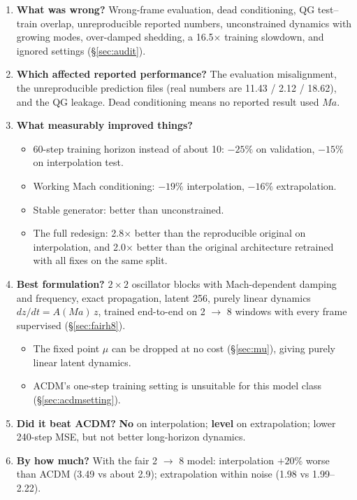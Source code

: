 \documentclass[10.5pt,a4paper]{article}
\begin{document}
\begin{enumerate}[leftmargin=*]
\item \textbf{What was wrong?} Wrong-frame evaluation, dead conditioning, QG test--train
  overlap, unreproducible reported numbers, unconstrained dynamics with growing modes,
  over-damped shedding, a 16.5$\times$ training slowdown, and ignored settings (\S\ref{sec:audit}).
\item \textbf{Which affected reported performance?} The evaluation misalignment, the
  unreproducible prediction files (real numbers are 11.43 / 2.12 / 18.62), and the QG leakage.
  Dead conditioning means no reported result used $Ma$.
\item \textbf{What measurably improved things?}
  \begin{itemize}
  \item 60-step training horizon instead of about 10: $-25\%$ on validation, $-15\%$ on
    interpolation test.
  \item Working Mach conditioning: $-19\%$ interpolation, $-16\%$ extrapolation.
  \item Stable generator: better than unconstrained.
  \item The full redesign: 2.8$\times$ better than the reproducible original on interpolation,
    and 2.0$\times$ better than the original architecture retrained with all fixes on the
    same split.
  \end{itemize}
\item \textbf{Best formulation?} $2\times2$ oscillator blocks with Mach-dependent damping and
  frequency, exact propagation, latent 256, purely linear dynamics $dz/dt = A(Ma)\,z$, trained
  end-to-end on 2 $\to$ 8 windows with every frame supervised (\S\ref{sec:fairh8}).
  \begin{itemize}
  \item The fixed point $\mu$ can be dropped at no cost (\S\ref{sec:mu}), giving purely linear
    latent dynamics.
  \item ACDM's one-step training setting is unsuitable for this model class
    (\S\ref{sec:acdmsetting}).
  \end{itemize}
\item \textbf{Did it beat ACDM?} \textbf{No} on interpolation; \textbf{level} on
  extrapolation; lower 240-step MSE, but not better long-horizon dynamics.
\item \textbf{By how much?} With the fair 2 $\to$ 8 model: interpolation $+20\%$ worse than
  ACDM (3.49 vs about 2.9); extrapolation within noise (1.98 vs 1.99--2.22).

\end{enumerate}
\end{document}
